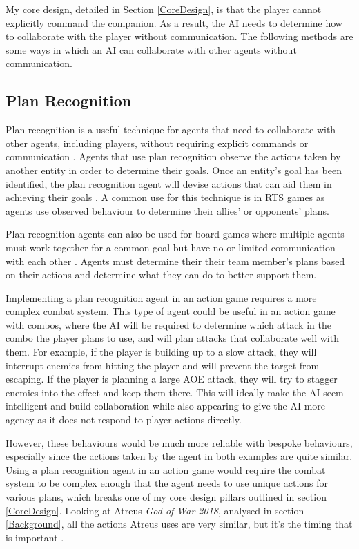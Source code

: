 \documentclass{IEEEtran}
\begin{document}
My core design, detailed in Section \ref{CoreDesign}, is that the player cannot explicitly command the companion. As a result, the AI needs to determine how to collaborate with the player without communication. The following methods are some ways in which an AI can collaborate with other agents without communication.

\subsection{Plan Recognition}
\label{PlanRecognition}

Plan recognition is a useful technique for agents that need to collaborate with other agents, including players, without requiring explicit commands or communication \cite{GeneratingCollabBehaviourPlanRecognition2016, PandemicPlanRecognition2021}. Agents that use plan recognition observe the actions taken by another entity in order to determine their goals. Once an entity’s goal has been identified, the plan recognition agent will devise actions that can aid them in achieving their goals \cite{GeneratingCollabBehaviourPlanRecognition2016}. A common use for this technique is in RTS games \cite{PlayerAdaptiveRTSAI2007} as agents use observed behaviour to determine their allies' or opponents' plans.

Plan recognition agents can also be used for board games where multiple agents must work together for a common goal but have no or limited communication with each other \cite{PandemicPlanRecognition2021}. Agents must determine their their team member's plans based on their actions and determine what they can do to better support them.

Implementing a plan recognition agent in an action game requires a more complex combat system. This type of agent could be useful in an action game with combos, where the AI will be required to determine which attack in the combo the player plans to use, and will plan attacks that collaborate well with them. For example, if the player is building up to a slow attack, they will interrupt enemies from hitting the player and will prevent the target from escaping. If the player is planning a large AOE attack, they will try to stagger enemies into the effect and keep them there. This will ideally make the AI seem intelligent and build collaboration while also appearing to give the AI more agency as it does not respond to player actions directly.

However, these behaviours would be much more reliable with bespoke behaviours, especially since the actions taken by the agent in both examples are quite similar. Using a plan recognition agent in an action game would require the combat system to be complex enough that the agent needs to use unique actions for various plans, which breaks one of my core design pillars outlined in section \ref{CoreDesign}. Looking at Atreus \textit{God of War 2018}, analysed in section \ref{Background}, all the actions Atreus uses are very similar, but it’s the timing that is important \cite{GDCAtreus}.
\end{document}
